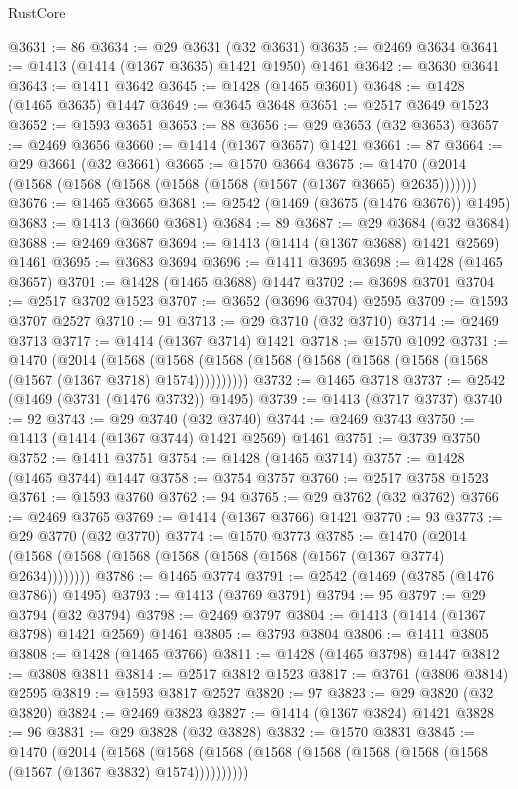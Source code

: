 \begin{lexlean}{RustCore}
\begin{coremodule}
@3631 := 86
@3634 := @29 @3631 (@32 @3631)
@3635 := @2469 @3634
@3641 := @1413 (@1414 (@1367 @3635) @1421 @1950) @1461
@3642 := @3630 @3641
@3643 := @1411 @3642
@3645 := @1428 (@1465 @3601)
@3648 := @1428 (@1465 @3635) @1447
@3649 := @3645 @3648
@3651 := @2517 @3649 @1523
@3652 := @1593 @3651
@3653 := 88
@3656 := @29 @3653 (@32 @3653)
@3657 := @2469 @3656
@3660 := @1414 (@1367 @3657) @1421
@3661 := 87
@3664 := @29 @3661 (@32 @3661)
@3665 := @1570 @3664
@3675 := @1470 (@2014 (@1568 (@1568 (@1568 (@1568 (@1568 (@1567 (@1367 @3665) @2635)))))))
@3676 := @1465 @3665
@3681 := @2542 (@1469 (@3675 (@1476 @3676)) @1495)
@3683 := @1413 (@3660 @3681)
@3684 := 89
@3687 := @29 @3684 (@32 @3684)
@3688 := @2469 @3687
@3694 := @1413 (@1414 (@1367 @3688) @1421 @2569) @1461
@3695 := @3683 @3694
@3696 := @1411 @3695
@3698 := @1428 (@1465 @3657)
@3701 := @1428 (@1465 @3688) @1447
@3702 := @3698 @3701
@3704 := @2517 @3702 @1523
@3707 := @3652 (@3696 @3704) @2595
@3709 := @1593 @3707 @2527
@3710 := 91
@3713 := @29 @3710 (@32 @3710)
@3714 := @2469 @3713
@3717 := @1414 (@1367 @3714) @1421
@3718 := @1570 @1092
@3731 := @1470
    (@2014
      (@1568 (@1568 (@1568 (@1568 (@1568 (@1568 (@1568 (@1568 (@1567 (@1367 @3718) @1574))))))))))
@3732 := @1465 @3718
@3737 := @2542 (@1469 (@3731 (@1476 @3732)) @1495)
@3739 := @1413 (@3717 @3737)
@3740 := 92
@3743 := @29 @3740 (@32 @3740)
@3744 := @2469 @3743
@3750 := @1413 (@1414 (@1367 @3744) @1421 @2569) @1461
@3751 := @3739 @3750
@3752 := @1411 @3751
@3754 := @1428 (@1465 @3714)
@3757 := @1428 (@1465 @3744) @1447
@3758 := @3754 @3757
@3760 := @2517 @3758 @1523
@3761 := @1593 @3760
@3762 := 94
@3765 := @29 @3762 (@32 @3762)
@3766 := @2469 @3765
@3769 := @1414 (@1367 @3766) @1421
@3770 := 93
@3773 := @29 @3770 (@32 @3770)
@3774 := @1570 @3773
@3785 := @1470 (@2014 (@1568 (@1568 (@1568 (@1568 (@1568 (@1568 (@1567 (@1367 @3774) @2634))))))))
@3786 := @1465 @3774
@3791 := @2542 (@1469 (@3785 (@1476 @3786)) @1495)
@3793 := @1413 (@3769 @3791)
@3794 := 95
@3797 := @29 @3794 (@32 @3794)
@3798 := @2469 @3797
@3804 := @1413 (@1414 (@1367 @3798) @1421 @2569) @1461
@3805 := @3793 @3804
@3806 := @1411 @3805
@3808 := @1428 (@1465 @3766)
@3811 := @1428 (@1465 @3798) @1447
@3812 := @3808 @3811
@3814 := @2517 @3812 @1523
@3817 := @3761 (@3806 @3814) @2595
@3819 := @1593 @3817 @2527
@3820 := 97
@3823 := @29 @3820 (@32 @3820)
@3824 := @2469 @3823
@3827 := @1414 (@1367 @3824) @1421
@3828 := 96
@3831 := @29 @3828 (@32 @3828)
@3832 := @1570 @3831
@3845 := @1470
    (@2014
      (@1568 (@1568 (@1568 (@1568 (@1568 (@1568 (@1568 (@1568 (@1567 (@1367 @3832) @1574))))))))))

\end{coremodule}
\end{lexlean}
